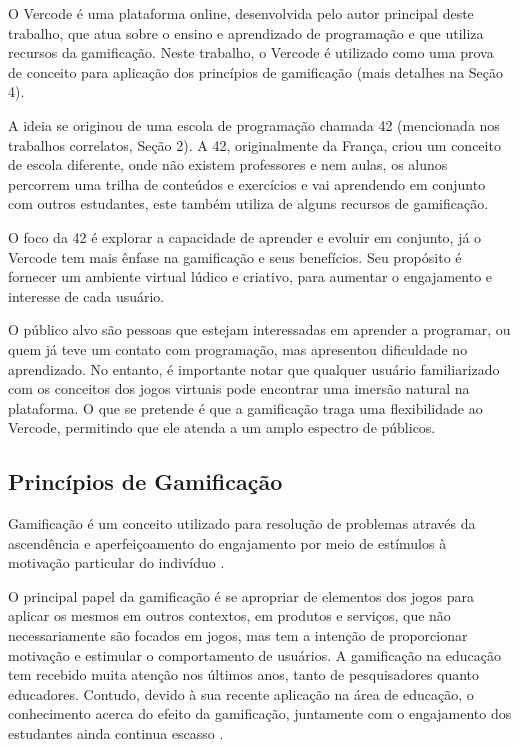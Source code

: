 \documentclass[12pt]{article}
\begin{document}
O Vercode é uma plataforma online, desenvolvida pelo autor principal deste trabalho, que atua sobre o ensino e aprendizado de programação e que utiliza recursos da gamificação. Neste trabalho, o Vercode é utilizado como uma prova de conceito para aplicação dos princípios de gamificação  (mais detalhes na Seção 4).

A ideia se originou de uma escola de programação chamada 42 (mencionada nos trabalhos correlatos, Seção 2). A 42, originalmente da França, criou um conceito de escola diferente, onde não existem professores e nem aulas, os alunos percorrem uma trilha de conteúdos e exercícios e vai aprendendo em conjunto com outros estudantes, este também utiliza de alguns recursos de gamificação. 

O foco da 42 é explorar a capacidade de aprender e evoluir em conjunto, já o Vercode tem mais ênfase na gamificação e seus benefícios. Seu propósito é fornecer um ambiente virtual lúdico e criativo, para aumentar o engajamento e interesse de cada usuário.

O público alvo são pessoas que estejam interessadas em aprender a programar, ou quem já teve um contato com programação, mas apresentou dificuldade no aprendizado. No entanto, é importante notar que qualquer usuário familiarizado com os conceitos dos jogos virtuais pode encontrar uma imersão natural na plataforma. O que se pretende é que a gamificação traga uma flexibilidade ao Vercode, permitindo que ele atenda a um amplo espectro de públicos.

\subsection{Princípios de Gamificação} \label{sec:principios}

Gamificação é um conceito utilizado para resolução de problemas através da ascendência e aperfeiçoamento do engajamento por meio de estímulos à motivação particular do indivíduo \cite{busarello2016gamification}. 

O principal papel da gamificação é se apropriar de elementos dos jogos para aplicar os mesmos em outros contextos, em produtos e serviços, que não necessariamente são focados em jogos, mas tem a intenção de proporcionar motivação e estimular o comportamento de usuários. A gamificação na educação tem recebido muita atenção nos últimos anos, tanto de pesquisadores quanto educadores. Contudo, devido à sua recente aplicação na área de educação, o conhecimento acerca do efeito da gamificação, juntamente com o engajamento dos estudantes ainda continua escasso \cite{dicheva2015gamification}. 
\end{document}
